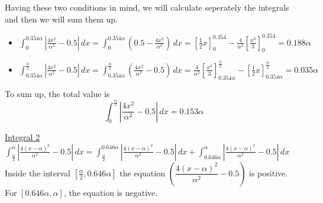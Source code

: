 Having these two conditions in mind, we will calculate seperately the integrals and then we will sum them up.
\begin{itemize}
	\item $\displaystyle \int_{0}^{0.354\alpha} \left| \frac{4x^2}{\alpha^2} - 0.5 \right| \, dx = \int_{0}^{0.354\alpha}\left(0.5 - \frac{4x^2}{\alpha^2}\right)\, dx = \left[\frac{1}{2}x\right]^{0.354}_0 - \frac{4}{\alpha^2}\left[\frac{x^3}{3}\right]^{0.354}_0 = 0.188\alpha$
	\vspace{3mm}
	
	\item $\displaystyle \int_{0.354\alpha}^{\frac{\alpha}{2}} \left| \frac{4x^2}{\alpha^2} - 0.5 \right| \, dx = \int_{0.354\alpha}^{\frac{\alpha}{2}} \left( \frac{4x^2}{\alpha^2} - 0.5\right) \, dx = \frac{4}{\alpha^2}\left[\frac{x^3}{3}\right]^{\frac{\alpha}{2}}_{0.354\alpha} - \left[\frac{1}{2}x\right]^{\frac{\alpha}{2}}_{0.354\alpha} = 0.035\alpha $
\end{itemize}
To sum up, the total value is \\
\begin{equation}
	\displaystyle\int_{0}^{\frac{\alpha}{2}} \left| \frac{4x^2}{\alpha^2} - 0.5 \right| \, dx = 0.153\alpha
\end{equation}
\label{eq:integral1}
\vspace{7mm}

\underline{Integral 2}\\

$\displaystyle \int_{\frac{\alpha}{2}}^{\alpha} \left| \frac{4(x-\alpha)^2}{\alpha^2} - 0.5 \right| \, dx = \int_{\frac{\alpha}{2}}^{0.646\alpha}\left| \frac{4(x-\alpha)^2}{\alpha^2} - 0.5 \right| \, dx + \int_{0.646\alpha}^{\alpha} \left| \frac{4(x-\alpha)^2}{\alpha^2} - 0.5 \right| \, dx$
\\

Inside the interval $\left[\frac{\alpha}{2}, 0.646\alpha \right]$ the equation $\left(\dfrac{4(x-\alpha)^2}{\alpha^2} - 0.5\right)$ is positive.\\
For $[0.646\alpha, \alpha]$, the equation is negative.\\

